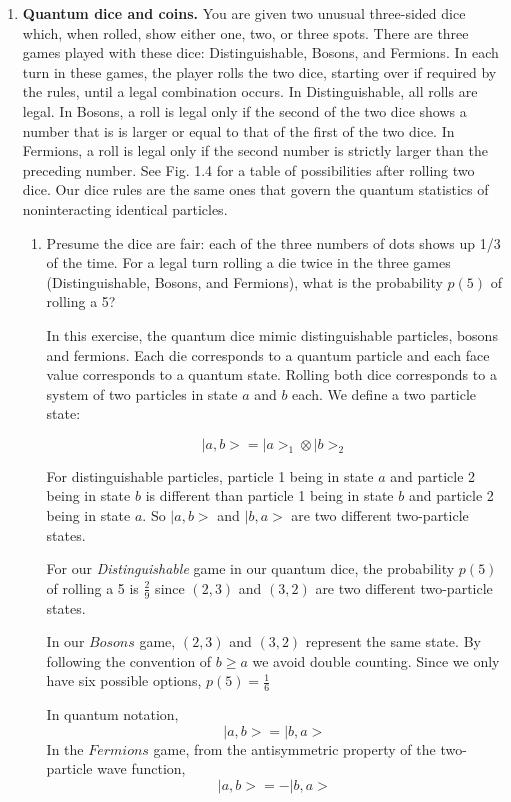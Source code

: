 \begin{enumerate}
\item \textbf{Quantum dice and coins.}
You are given two unusual three-sided dice
which, when rolled, show either one, two, or
three spots. There are three games played with
these dice: Distinguishable, Bosons, and Fermions.
In each turn in these games, the player
rolls the two dice, starting over if required by the
rules, until a legal combination occurs. In Distinguishable,
all rolls are legal. In Bosons, a roll
is legal only if the second of the two dice shows
a number that is is larger or equal to that of the
first of the two dice. In Fermions, a roll is legal
only if the second number is strictly larger than
the preceding number. See Fig. 1.4 for a table of
possibilities after rolling two dice.
Our dice rules are the same ones that govern
the quantum statistics of noninteracting identical
particles.

\begin{enumerate}
\item Presume the dice are fair: each of the three numbers of dots shows up 1/3 of the time. For a legal turn rolling a die twice in the three games (Distinguishable, Bosons, and Fermions), what is the probability $p(5)$ of rolling a 5?




In this exercise, the quantum dice mimic distinguishable particles, bosons and fermions. Each die corresponds to a quantum particle and each face value corresponds to a quantum state. Rolling both dice corresponds to a system of two particles in state $a$ and $b$ each. We define a two particle state:

$$
|a,b> = |a>_1 \otimes |b>_2
$$

For distinguishable particles, particle 1 being in state $a$ and particle 2 being in state $b$ is different than particle 1 being in state $b$ and particle 2 being in state $a$. So $|a,b>$ and $|b,a>$ are two different two-particle states. 

For our \textit{Distinguishable} game in our quantum dice, the probability $p(5)$ of rolling a 5 is $\frac{2}{9}$ since $(2,3)$ and $(3,2)$ are two different two-particle states.

In our $\textit{Bosons}$ game, $(2,3)$ and $(3,2)$ represent the same state. By following the convention of $b \geq a$ we avoid double counting. Since we only have six possible options, $p(5) = \frac{1}{6}$

In quantum notation,
$$
|a,b> = |b,a>
$$
In the $\textit{Fermions}$ game, from the antisymmetric property of the two-particle wave function,
$$
|a,b> = -|b,a>
$$


\end{enumerate}
\end{enumerate}
